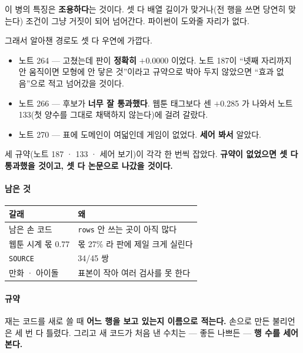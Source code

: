 \documentclass[10pt]{article}
\begin{document}
이 병의 특징은 \textbf{조용하다}는 것이다. 셋 다 배열 길이가 맞거나(전 행을
쓰면 당연히 맞는다) 조건이 그냥 거짓이 되어 넘어간다. 파이썬이 도와줄
자리가 없다.

그래서 알아챈 경로도 셋 다 우연에 가깝다.

\begin{itemize}
\item 노트 264 --- 고쳤는데 판이 \textbf{정확히} $+$0.0000 이었다. 노트 187이
``넷째 자리까지 안 움직이면 모형에 안 닿은 것''이라고 규약으로 박아 두지
않았으면 ``효과 없음''으로 적고 넘어갔을 것이다.
\item 노트 266 --- 후보가 \textbf{너무 잘 통과했다}. 웹툰 태그보다 센
$+$0.285 가 나와서 노트 133(첫 양수를 그대로 채택하지 않는다)에 걸려 갈랐다.
\item 노트 270 --- 표에 도메인이 여덟인데 게임이 없었다. \textbf{세어 봐서}
알았다.
\end{itemize}

세 규약(노트 187 · 133 · 세어 보기)이 각각 한 번씩 잡았다. \textbf{규약이
없었으면 셋 다 통과했을 것이고, 셋 다 논문으로 나갔을 것이다.}

\paragraph{남은 것}
\begin{center}\small
\begin{tabular}{ll}
\hline
갈래 & 왜 \\
\hline
남은 손 코드 & \texttt{rows} 안 쓰는 곳이 아직 많다 \\
웹툰 시계 몫 0.77 & 몫 27\% 라 판에 제일 크게 실린다 \\
\texttt{SOURCE} & 34/45 쌍 \\
만화 · 아이돌 & 표본이 작아 여러 검사를 못 한다 \\
\hline
\end{tabular}
\end{center}

\paragraph{규약} 재는 코드를 새로 쓸 때 \textbf{어느 행을 보고 있는지 이름으로
적는다.} 손으로 만든 불리언은 세 번 다 틀렸다. 그리고 새 코드가 처음 낸
수치는 --- 좋든 나쁘든 --- \textbf{행 수를 세어 본다.}
\end{document}
